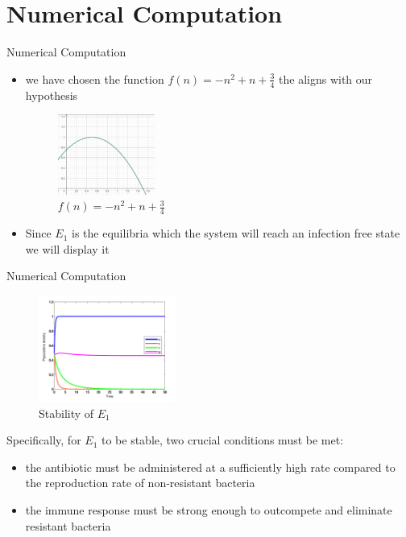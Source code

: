 \documentclass{beamer}
\begin{document}
\section{Numerical Computation}
\begin{frame}[shrink= 25]{Numerical Computation}
\begin{itemize}
	\item we have chosen the function $f(n)=-n^2+n+\frac{3}{4}$ the aligns with our hypothesis
	 \vspace{1mm}  
	\begin{figure}
			\includegraphics[width=0.3\textwidth]{Screenshot 2025-08-04 174654.png}
		\caption{$f(n)=-n^2+n+\frac{3}{4}$}
	\end{figure}
	\item Since $E_1$ is the equilibria which the system will reach an infection free state we will display it
\end{itemize}

\end{frame}

\begin{frame}[shrink=20]{Numerical Computation}
\begin{figure}
		\includegraphics[width=0.4\textwidth]{Screenshot 2025-08-04 180807.png}
        \caption{Stability of $E_1$ \cite{MOSTEFAOUI2025108412}}
\end{figure}	

Specifically, for $E_1$ to be stable, two crucial conditions must be met:
\begin{itemize}
	\item the antibiotic must be administered at a sufficiently	high rate compared to the reproduction rate of non-resistant bacteria
	\item the immune response must be strong enough to outcompete and eliminate resistant bacteria
\end{itemize}

\end{frame}
\end{document}
